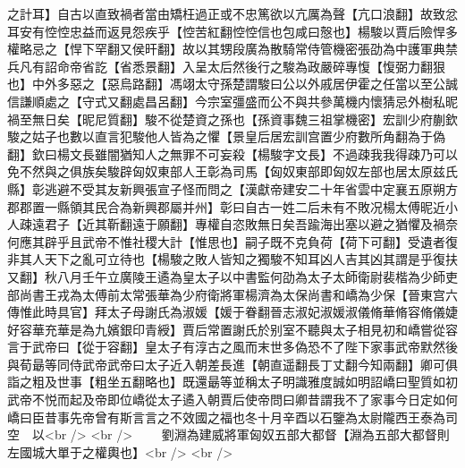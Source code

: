 之計耳】自古以直致禍者當由矯枉過正或不忠篤欲以亢厲為聲【亢口浪翻】故致忿耳安有悾悾忠益而返見怨疾乎【悾苦紅翻悾悾信也包咸曰慤也】楊駿以賈后險悍多權略忌之【悍下罕翻又侯旰翻】故以其甥段廣為散騎常侍管機密張劭為中護軍典禁兵凡有詔命帝省訖【省悉景翻】入呈太后然後行之駿為政嚴碎專愎【愎弼力翻狠也】中外多惡之【惡烏路翻】馮翊太守孫楚謂駿曰公以外戚居伊霍之任當以至公誠信謙順處之【守式又翻處昌呂翻】今宗室彊盛而公不與共參萬機内懷猜忌外樹私昵禍至無日矣【昵尼質翻】駿不從楚資之孫也【孫資事魏三祖掌機密】宏訓少府蒯欽駿之姑子也數以直言犯駿他人皆為之懼【景皇后居宏訓宫置少府數所角翻為于偽翻】欽曰楊文長雖闇猶知人之無罪不可妄殺【楊駿字文長】不過疎我我得疎乃可以免不然與之俱族矣駿辟匈奴東部人王彰為司馬【匈奴東部即匈奴左部也居太原兹氏縣】彰逃避不受其友新興張宣子怪而問之【漢獻帝建安二十年省雲中定襄五原朔方郡郡置一縣領其民合為新興郡屬并州】彰曰自古一姓二后未有不敗况楊太傅昵近小人疎遠君子【近其靳翻遠于願翻】專權自恣敗無日矣吾踰海出塞以避之猶懼及禍奈何應其辟乎且武帝不惟社稷大計【惟思也】嗣子既不克負荷【荷下可翻】受遺者復非其人天下之亂可立待也【楊駿之敗人皆知之獨駿不知耳凶人吉其凶其謂是乎復扶又翻】秋八月壬午立廣陵王遹為皇太子以中書監何劭為太子太師衛尉裴楷為少師吏部尚書王戎為太傅前太常張華為少府衛將軍楊濟為太保尚書和嶠為少保【晉東宫六傳惟此時具官】拜太子母謝氏為淑媛【媛于眷翻晉志淑妃淑媛淑儀脩華脩容脩儀婕好容華充華是為九嬪銀印青綬】賈后常置謝氏於别室不聽與太子相見初和嶠嘗從容言于武帝曰【從于容翻】皇太子有淳古之風而末世多偽恐不了陛下家事武帝默然後與荀朂等同侍武帝武帝曰太子近入朝差長進【朝直遥翻長丁丈翻今知兩翻】卿可俱詣之粗及世事【粗坐五翻略也】既還朂等並稱太子明識雅度誠如明詔嶠曰聖質如初武帝不悦而起及帝即位嶠從太子遹入朝賈后使帝問曰卿昔謂我不了家事今日定如何嶠曰臣昔事先帝曾有斯言言之不效國之福也冬十月辛酉以石鑒為太尉隴西王泰為司空　以<br />
<br />
　　劉淵為建威將軍匈奴五部大都督【淵為五部大都督則左國城大單于之權輿也】<br />
<br />
